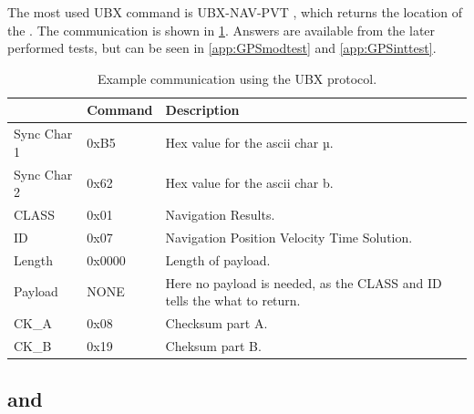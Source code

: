 The most used UBX command is UBX-NAV-PVT \cite[p.~160]{NEO7_proto}, which returns the location of the \GPS.
The communication is shown in \cref{tab:UBXex}.
Answers are available from the later performed tests, but can be seen in \cref{app:GPSmodtest} and \cref{app:GPSinttest}.

\begin{table}
	\centering
	\begin{tabularx}{\textwidth}{l l X}
		\toprule
		& \textbf{Command} & \textbf{Description} \\
		\midrule
		Sync Char 1 & 0xB5 & Hex value for the ascii char µ. \\
		Sync Char 2 & 0x62 & Hex value for the ascii char b. \\
		CLASS & 0x01 & Navigation Results. \\
		ID & 0x07 &  Navigation Position Velocity Time Solution. \\
		Length & 0x0000 & Length of payload. \\
		Payload & NONE & Here no payload is needed, as the CLASS and ID tells the \GPS what to return. \\
		CK\_A & 0x08 & Checksum part A. \\
		CK\_B & 0x19 & Cheksum part B. \\
		\bottomrule
	\end{tabularx}
	\caption{Example communication using the UBX protocol.}
	\label{tab:UBXex}
\end{table}

\subsection{\SAMD and \SARA}



\FloatBarrier